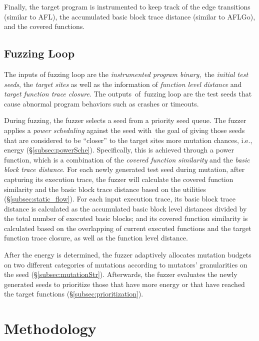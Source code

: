 Finally, the target program is instrumented to keep track of the edge transitions (similar to AFL), the accumulated basic block trace distance (similar to AFLGo), and the covered functions.


\subsection{Fuzzing Loop}\label{sec:fuzz_flow}

The inputs of fuzzing loop are the \textit{instrumented program binary},~the \textit{initial test seeds}, the \textit{target sites} as well as the information of \textit{function level distance} and \textit{target function trace closure}.
The outputs~of~fuzzing loop are the test seeds that cause abnormal program behaviors such as crashes or timeouts.

During fuzzing, the fuzzer selects a seed from a priority seed queue. The fuzzer applies a \textit{power scheduling} against the seed with~the goal of giving those seeds that are considered to be ``closer'' to the target sites more mutation chances, i.e., energy (\S\ref{subsec:powerSche}). Specifically, this is achieved through a power function, which is a combination of the \textit{covered function similarity} and the \textit{basic block trace distance}. For each newly generated test seed during mutation, after capturing its execution trace, the fuzzer will calculate the covered function similarity and the basic block trace distance based on the utilities (\S\ref{subsec:static_flow}). For each input execution trace, its basic block trace distance is calculated as the accumulated basic block level distances divided by the total number of executed basic blocks; and its covered function similarity is calculated based on the overlapping of current executed functions and the target function trace closure, as well as the function level distance.

After the energy is determined, the fuzzer adaptively allocates mutation budgets on two different categories of mutations according to mutators' granularities on the seed (\S\ref{subsec:mutationStr}).
Afterwards, the fuzzer evaluates the newly generated seeds to prioritize those that have more energy or that have reached the target functions (\S\ref{subsec:prioritization}).

%
 

\section{Methodology}

